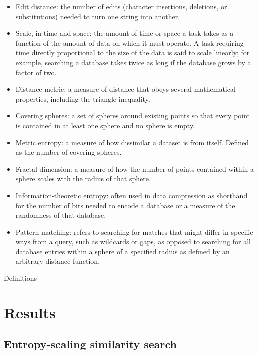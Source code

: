 \documentclass[review,preprint,12pt]{elsarticle}
\theoremstyle{definition}
\theoremstyle{remark}
\numberwithin{equation}{section}
\begin{document}
\begin{glosbox}[tbhp]
        \small
    \begin{itemize}
        \item Edit distance: the number of edits (character insertions, deletions, or substitutions) needed to turn one string into another.
        \item Scale, in time and space: the amount of time or space a task takes as a function of the amount of data on which it must operate. A task requiring time directly proportional to the size of the data is said to scale linearly; for example, searching a database takes twice as long if the database grows by a factor of two.
        \item Distance metric: a measure of distance that obeys several mathematical properties, including the triangle inequality.
        \item Covering spheres: a set of spheres around existing points so that every point is contained in at least one sphere and no sphere is empty.
        \item Metric entropy: a measure of how dissimilar a dataset is from itself. Defined as the number of covering spheres.
        \item Fractal dimension: a measure of how the number of points contained within a sphere scales with the radius of that sphere.
        \item Information-theoretic entropy: often used in data compression as shorthand for the number of bits needed to encode a database or a measure of the randomness of that database.
        \item Pattern matching: refers to searching for matches that might differ in specific ways from a query, such as wildcards or gaps, as opposed to searching for all database entries within a sphere of a specified radius as defined by an arbitrary distance function.
    \end{itemize}
    \caption{Definitions}
    \label{box:glos}
\end{glosbox}

\section{Results}

\subsection{Entropy-scaling similarity search}
\end{document}

